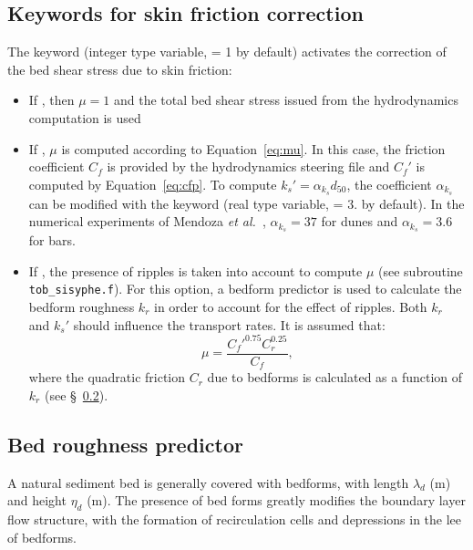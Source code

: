 \subsection{Keywords for skin friction correction}
The keyword  (integer type variable, {\ttfamily = 1} by default) activates the correction of the bed shear stress due to skin friction:
\begin{itemize}
\item If , then $\mu=1$ and the total bed shear stress issued from the hydrodynamics computation is used
\item If , $\mu$ is computed according to Equation~\ref{eq:mu}. In this case, the friction coefficient $C_f$ is provided by the hydrodynamics steering file and $C_f'$ is computed by Equation~\ref{eq:cfp}. To compute $k_s'=\alpha_{k_s} d_{50}$, the coefficient $\alpha_{k_s}$ can be modified with the keyword  (real type variable, {\ttfamily = 3.} by default). In the numerical experiments of Mendoza \textit{et al.}~\cite{Mendoza15}, $\alpha_{k_s}=37$ for dunes and $\alpha_{k_s}=3.6$ for bars.  
\item If , the presence of ripples is taken into account to compute $\mu$ (see subroutine \texttt{tob\_sisyphe.f}). For this option, a bedform predictor is used to calculate the bedform roughness $k_r$ in order to account for the effect of ripples. Both $k_r$
and $k_s'$ should influence the transport rates. It is assumed that:
\begin{equation}\label{eq:mu2}
\mu =\frac{C_f'^{0.75} C_r^{0.25}}{C_f}, 
\end{equation}
where the quadratic friction $C_r$ due to bedforms is calculated as a
function of $k_r$ (see \S~\ref{sec:bedroughpredictor}). 
\end{itemize}

\subsection{Bed roughness predictor}\label{sec:bedroughpredictor}
A natural sediment bed is generally covered with bedforms, with length $\lambda_d$ (m)
and height $\eta_d$ (m). The presence of bed forms greatly modifies the boundary
layer flow structure, with the formation of recirculation cells and
depressions in the lee of bedforms.\\

